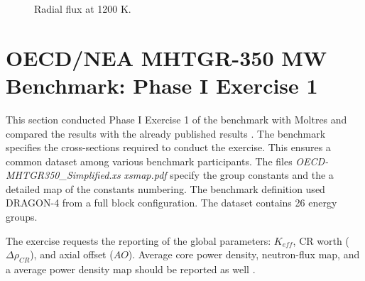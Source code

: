 \documentclass[11pt,letterpaper]{article}
\begin{document}
\begin{figure}[htbp!]
	\centering
	\hfill
	\caption{Radial flux at 1200 K.}
	\label{fig:fullcore-1200-radial1}
\end{figure}


\section{OECD/NEA MHTGR-350 MW Benchmark: Phase I Exercise 1}

This section conducted Phase I Exercise 1 of the benchmark with Moltres and compared the results with the already published results \cite{oecd_nea_coupled_2020}.
The benchmark specifies the cross-sections required to conduct the exercise.
This ensures a common dataset among various benchmark participants.
The files \textit{OECD-MHTGR350\_Simplified.xs} \textit{xsmap.pdf} specify the group constants and the a detailed map of the constants numbering.
The benchmark definition used DRAGON-4 \cite{marleau_user_2016} from a full block configuration.
The dataset contains 26 energy groups.

The exercise requests the reporting of the global parameters: $K_{eff}$, \gls{CR} worth ($\Delta \rho_{CR}$), and axial offset ($AO$).
Average core power density, neutron-flux map, and a average power density map should be reported as well \cite{oecd_nea_benchmark_2017}.
\end{document}
